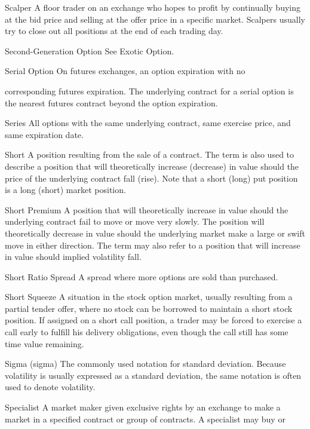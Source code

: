 Scalper A floor trader on an exchange who hopes to profit by continually buying at the bid price and selling at the offer price in a specific market. Scalpers usually try to close out all positions at the end of each trading day.\par
Second-Generation Option See Exotic Option.\par
Serial Option On  futures  exchanges, an  option  expiration  with no\par
corresponding futures expiration. The underlying contract for a serial option is the nearest futures contract beyond the option expiration.\par
Series All options with the same underlying contract, same exercise price, and same expiration date.\par
Short A position resulting from the sale of a contract. The term is also used to describe a position that will theoretically increase (decrease) in value should the price of the underlying contract fall (rise). Note that a short (long) put position is a long (short) market position.\par
Short Premium A position that will theoretically increase in value should the underlying contract fail to move or move very slowly. The position will theoretically decrease in value should the underlying market make a large or swift move in either direction. The term may also refer to a position that will increase in value should implied volatility fall.\par
Short Ratio Spread A spread where more options are sold than purchased.\par
Short Squeeze A situation in the stock option market, usually resulting from a partial tender offer, where no stock can be borrowed to maintain a short stock position. If assigned on a short call position, a trader may be forced to exercise a call early to fulfill his delivery obligations, even though the call still has some time value remaining.\par
Sigma (sigma) The commonly used notation for standard deviation. Because volatility is usually expressed as a standard deviation, the same notation is often used to denote volatility.\par
Specialist A market maker given exclusive rights by an exchange to make a market in a specified contract or group of contracts. A specialist may buy or\par

